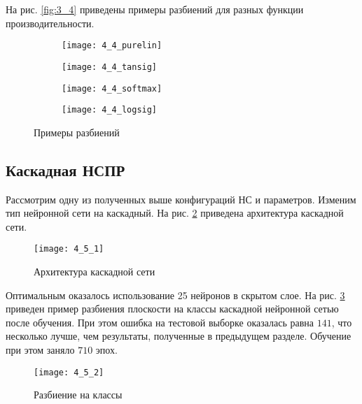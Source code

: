 На рис. \ref{fig:3_4} приведены примеры разбиений для разных функции производительности.
\vspace{-0.5cm}
\begin{figure}[H]
\begin{center}
	\begin{subfigure}[b]{0.49\textwidth}
		\texttt{[image: 4\_4\_purelin]}
		\caption{}
	\end{subfigure}
	\begin{subfigure}[b]{0.49\textwidth}
		\texttt{[image: 4\_4\_tansig]}
		\caption{}
	\end{subfigure}
	\begin{subfigure}[b]{0.49\textwidth}
		\texttt{[image: 4\_4\_softmax]}
		\caption{}
	\end{subfigure}
	\begin{subfigure}[b]{0.49\textwidth}
		\texttt{[image: 4\_4\_logsig]}
		\caption{}
	\end{subfigure}
	\caption{Примеры разбиений}
	\label{fig:4_4}
\end{center}
\end{figure}

\newpage

\subsection{Каскадная НСПР}

Рассмотрим одну из полученных выше конфигураций НС и параметров. Изменим тип нейронной сети на каскадный. На рис. \ref{fig:4_5_1} приведена архитектура каскадной сети.

\begin{figure}[H]
\begin{center}
	\texttt{[image: 4\_5\_1]}
	\caption{Архитектура каскадной сети}
	\label{fig:4_5_1}
\end{center}
\end{figure}

\vspace{-0.5cm}
Оптимальным оказалось использование 25 нейронов в скрытом слое. На рис. \ref{fig:4_5_2} приведен пример разбиения плоскости на классы каскадной нейронной сетью после обучения. При этом ошибка  на тестовой выборке оказалась равна $141$, что несколько лучше, чем результаты, полученные в предыдущем разделе. Обучение при этом заняло $710$ эпох.
\vspace{-0.5cm}
\begin{figure}[H]
\begin{center}
	\texttt{[image: 4\_5\_2]}
	\caption{Разбиение на классы}
	\label{fig:4_5_2}
\end{center}
\end{figure}
\vspace{-1cm}

